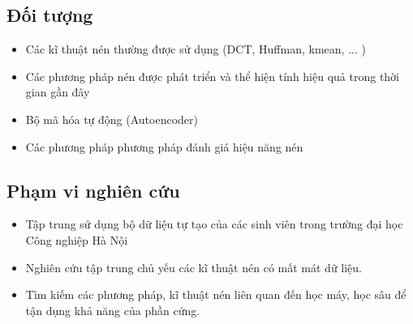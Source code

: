 \subsection{Đối tượng}
\begin{itemize}
      \item Các kĩ thuật nén thường được sử dụng (DCT, Huffman, kmean, ... )
      \item Các phương pháp nén được phát triển và thể hiện tính hiệu quả trong thời gian gần đây
      \item Bộ mã hóa tự động (Autoencoder)
      \item Các phương pháp phương pháp đánh giá hiệu năng nén
\end{itemize}
\subsection{Phạm vi nghiên cứu}
\begin{itemize}
      \item Tập trung sử dụng bộ dữ liệu tự tạo của các sinh viên trong trường đại học Công nghiệp Hà Nội
      \item Nghiên cứu tập trung chủ yếu các kĩ thuật nén có mất mát dữ liệu.
      \item Tìm kiếm các phương pháp, kĩ thuật nén liên quan đến học máy, học sâu để
            tận dụng khả năng của phần cứng.
\end{itemize}



